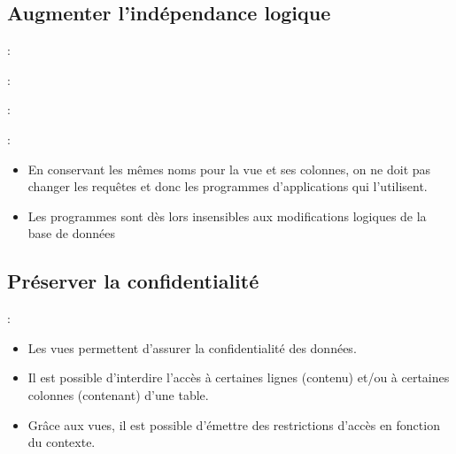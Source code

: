 \documentclass[10pt]{beamer}
\begin{document}
\subsection{Augmenter l'indépendance logique}
\begin{frame}{\secname : \subsecname}
    
\end{frame}

\begin{frame}{\secname : \subsecname}
    
\end{frame}

\begin{frame}{\secname : \subsecname}
    
\end{frame}

\begin{frame}{\secname : \subsecname}
    \begin{itemize}
        \item En conservant les mêmes noms pour la vue et ses colonnes, on ne doit pas changer les requêtes et donc les programmes d'applications qui l'utilisent.
        \item Les programmes sont dès lors insensibles aux modifications logiques de la base de données
    \end{itemize}
\end{frame}

\subsection{Préserver la confidentialité}
\begin{frame}{\secname : \subsecname}
    \begin{itemize}
        \item Les vues permettent d'assurer la confidentialité des données.
        \item Il est possible d'interdire l'accès à certaines lignes (contenu) et/ou à certaines colonnes (contenant) d'une table.
        \item Grâce aux vues, il est possible d'émettre des restrictions d'accès en fonction du contexte.
    \end{itemize}
\end{frame}
\end{document}
